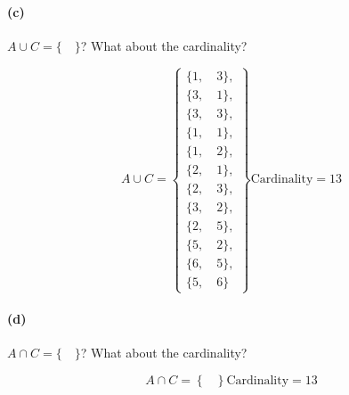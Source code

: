     \paragraph*{(c)}
    $A \cup C = \{\quad\}$? What about the cardinality?

    \begin{mdframed}
        \begin{equation}
            A \cup C =
            \left\{
                \begin{array}{l}
                    \{1, \quad 3\}, \\
                    \{3, \quad 1\}, \\
                    \{3, \quad 3\}, \\
                    \{1, \quad 1\}, \\
                    \{1, \quad 2\}, \\
                    \{2, \quad 1\}, \\
                    \{2, \quad 3\}, \\
                    \{3, \quad 2\}, \\
                    \{2, \quad 5\}, \\
                    \{5, \quad 2\}, \\
                    \{6, \quad 5\}, \\
                    \{5, \quad 6\}
                \end{array}
            \right\}
            \text{Cardinality} = 13
        \end{equation}
    \end{mdframed}

    \paragraph*{(d)}
    $A \cap C = \{\quad\}$? What about the cardinality?
    
    \begin{mdframed}
        \begin{equation}
            A \cap C =
            \left\{
                \begin{array}{l}

                \end{array}
            \right\}
            \text{Cardinality} = 13
        \end{equation}
    \end{mdframed}

